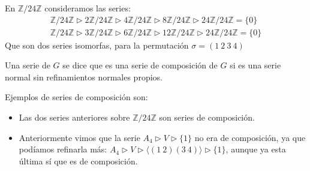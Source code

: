 \begin{ejemplo}
    En $\mathbb{Z}/24\mathbb{Z}$ consideramos las series:
    \begin{gather*}
        \mathbb{Z}/24\mathbb{Z} \rhd 2\mathbb{Z}/24\mathbb{Z} \rhd 4\mathbb{Z}/24\mathbb{Z} \rhd 8\mathbb{Z}/24\mathbb{Z} \rhd 24\mathbb{Z}/24\mathbb{Z} = \{0\} \\
        \mathbb{Z}/24\mathbb{Z} \rhd 3\mathbb{Z}/24\mathbb{Z} \rhd 6\mathbb{Z}/24\mathbb{Z} \rhd 12\mathbb{Z}/24\mathbb{Z} \rhd 24\mathbb{Z}/24\mathbb{Z} = \{0\}
    \end{gather*}
    Que son dos series isomorfas, para la permutación $\sigma=(1\ 2\ 3\ 4)$
\end{ejemplo}

\begin{definicion}
    Una serie de $G$ se dice que es una serie de composición de $G$ si es una serie normal sin refinamientos normales propios.
\end{definicion}

\begin{ejemplo}
    Ejemplos de series de composición son:
    \begin{itemize}
        \item Las dos series anteriores sobre $\mathbb{Z}/24\mathbb{Z}$ son series de composición.
        \item Anteriormente vimos que la serie $A_4 \rhd V \rhd \{1\}$ no era de composición, ya que podíamos refinarla más: $A_4 \rhd V \rhd \langle (1\ 2)(3\ 4) \rangle \rhd \{1\} $, aunque ya esta última sí que es de composición.
    \end{itemize}
\end{ejemplo}

